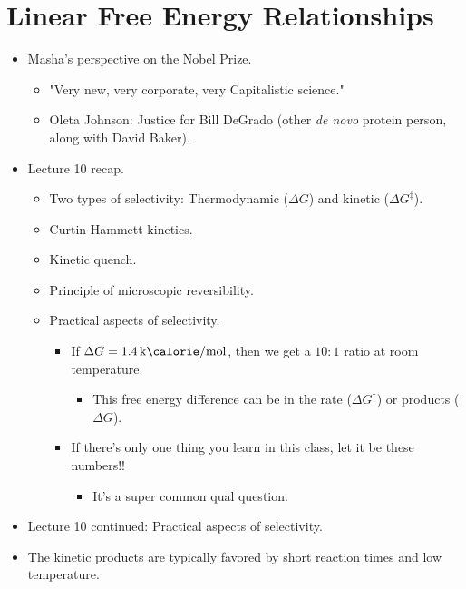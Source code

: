 \documentclass[../notes.tex]{subfiles}
\begin{document}
\section{Linear Free Energy Relationships}
\begin{itemize}
    \item {}Masha's perspective on the Nobel Prize.
    \begin{itemize}
        \item "Very new, very corporate, very Capitalistic science."
        \item Oleta Johnson: Justice for Bill DeGrado (other \emph{de novo} protein person, along with David Baker).
    \end{itemize}
    \item Lecture 10 recap.
    \begin{itemize}
        \item Two types of selectivity: Thermodynamic ($\Delta G$) and kinetic ($\Delta G^\ddagger$).
        \item Curtin-Hammett kinetics.
        \item Kinetic quench.
        \item Principle of microscopic reversibility.
        \item Practical aspects of selectivity.
        \begin{itemize}
            \item If $\Delta G=\kcal{1.4}$, then we get a $10:1$ ratio at room temperature.
            \begin{itemize}
                \item This free energy difference can be in the rate ($\Delta G^\ddagger$) or products ($\Delta G$).
            \end{itemize}
            \item If there's only one thing you learn in this class, let it be these numbers!!
            \begin{itemize}
                \item It's a super common qual question.
            \end{itemize}
        \end{itemize}
    \end{itemize}
    \item Lecture 10 continued: Practical aspects of selectivity.
    \item The kinetic products are typically favored by short reaction times and low temperature.
    \begin{itemize}

\end{itemize}
\end{itemize}
\end{document}
